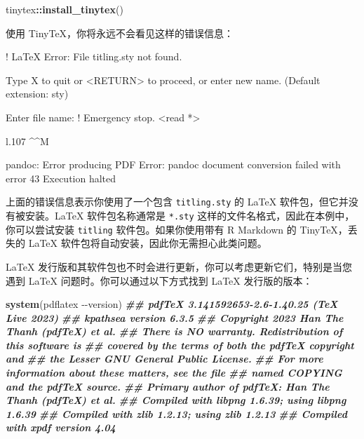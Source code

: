 \documentclass[
  12pt,
]{krantz}
\newenvironment{Shaded}{\begin{snugshade}}{\end{snugshade}}
\newcommand{\DocumentationTok}[1]{\textcolor[rgb]{0.56,0.35,0.01}{\textbf{\textit{#1}}}}
\newcommand{\FunctionTok}[1]{\textcolor[rgb]{0.13,0.29,0.53}{\textbf{#1}}}
\newcommand{\NormalTok}[1]{#1}
\newcommand{\SpecialCharTok}[1]{\textcolor[rgb]{0.81,0.36,0.00}{\textbf{#1}}}
\newcommand{\StringTok}[1]{\textcolor[rgb]{0.31,0.60,0.02}{#1}}
\theoremstyle{definition}
\theoremstyle{definition}
\theoremstyle{definition}
\theoremstyle{definition}
\theoremstyle{remark}
\begin{document}
\begin{Shaded}
\begin{Highlighting}[]
\NormalTok{tinytex}\SpecialCharTok{::}\FunctionTok{install\_tinytex}\NormalTok{()}
\end{Highlighting}
\end{Shaded}

使用 TinyTeX，你将永远不会看见这样的错误信息：

\begin{Shaded}
\begin{Highlighting}[]
\NormalTok{! LaTeX Error: File \textasciigrave{}titling.sty\textquotesingle{} not found.}

\NormalTok{Type X to quit or \textless{}RETURN\textgreater{} to proceed,}
\NormalTok{or enter new name. (Default extension: sty)}

\NormalTok{Enter file name: }
\NormalTok{! Emergency stop.}
\NormalTok{\textless{}read *\textgreater{} }
         
\NormalTok{l.107 \^{}\^{}M}

\NormalTok{pandoc: Error producing PDF}
\NormalTok{Error: pandoc document conversion failed with error 43}
\NormalTok{Execution halted}
\end{Highlighting}
\end{Shaded}

上面的错误信息表示你使用了一个包含 \texttt{titling.sty} 的 LaTeX 软件包，但它并没有被安装。LaTeX 软件包名称通常是 \texttt{*.sty} 这样的文件名格式，因此在本例中，你可以尝试安装 \texttt{titling} 软件包。如果你使用带有 R Markdown 的 TinyTeX，丢失的 LaTeX 软件包将自动安装，因此你无需担心此类问题。

LaTeX 发行版和其软件包也不时会进行更新，你可以考虑更新它们，特别是当您遇到 LaTeX 问题时。你可以通过以下方式找到 LaTeX 发行版的版本：

\begin{Shaded}
\begin{Highlighting}[]
\FunctionTok{system}\NormalTok{(}\StringTok{\textquotesingle{}pdflatex {-}{-}version\textquotesingle{}}\NormalTok{)}
\DocumentationTok{\#\#  pdfTeX 3.141592653{-}2.6{-}1.40.25 (TeX Live 2023)}
\DocumentationTok{\#\#  kpathsea version 6.3.5}
\DocumentationTok{\#\#  Copyright 2023 Han The Thanh (pdfTeX) et al.}
\DocumentationTok{\#\#  There is NO warranty.  Redistribution of this software is}
\DocumentationTok{\#\#  covered by the terms of both the pdfTeX copyright and}
\DocumentationTok{\#\#  the Lesser GNU General Public License.}
\DocumentationTok{\#\#  For more information about these matters, see the file}
\DocumentationTok{\#\#  named COPYING and the pdfTeX source.}
\DocumentationTok{\#\#  Primary author of pdfTeX: Han The Thanh (pdfTeX) et al.}
\DocumentationTok{\#\#  Compiled with libpng 1.6.39; using libpng 1.6.39}
\DocumentationTok{\#\#  Compiled with zlib 1.2.13; using zlib 1.2.13}
\DocumentationTok{\#\#  Compiled with xpdf version 4.04}
\end{Highlighting}
\end{Shaded}
\end{document}
